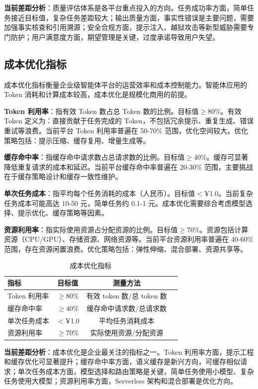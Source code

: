 \documentclass[12pt,a4paper]{article}
\begin{document}
\textbf{当前差距分析}：质量评估体系是各平台重点投入的方向。任务成功率方面，简单任务接近目标值，复杂任务差距较大；输出质量方面，事实性错误是主要问题，需要加强事实核查和引用溯源；安全合规方面，提示注入、越狱攻击等新型威胁需要专门防护；用户满意度方面，期望管理是关键，过度承诺导致用户失望。

\subsection{成本优化指标}

成本优化指标衡量企业级智能体平台的运营效率和成本控制能力。智能体应用的 Token 消耗和计算成本较高，成本优化是规模化商用的前提。

\textbf{Token 利用率}：指有效 Token 数占总 Token 数的比例。目标值$\geq$80\%。有效 Token 定义为：直接贡献于任务完成的 Token，不包括冗余提示、重复生成、错误重试等浪费。当前平台 Token 利用率普遍在 50-70\% 范围，优化空间较大。优化策略包括：提示压缩、缓存复用、增量生成等。

\textbf{缓存命中率}：指缓存命中请求数占总请求数的比例。目标值$\geq$40\%。缓存可显著降低重复请求的成本和延迟。当前平台缓存命中率普遍在 20-30\% 范围，主要挑战在于缓存策略设计和缓存一致性维护。

\textbf{单次任务成本}：指平均每个任务消耗的成本（人民币）。目标值$<$¥1.0。当前复杂任务成本可能高达 10-50 元，简单任务约 0.1-1 元。成本优化需要综合考虑模型选择、提示优化、缓存策略等因素。

\textbf{资源利用率}：指实际使用资源占分配资源的比例。目标值$\geq$70\%。资源包括计算资源（CPU/GPU）、存储资源、网络资源等。当前平台资源利用率普遍在 40-60\% 范围，存在资源闲置浪费。优化策略包括：弹性伸缩、混合部署、资源共享等。

\begin{table}[h]
\centering
\caption{成本优化指标}
\label{tab:cost}
\begin{tabular}{@{}lccl@{}}
\toprule
\textbf{指标} & \textbf{目标值} & \textbf{测量方法} \\
\midrule
Token 利用率 & $\geq$80\% & 有效 token 数/总 token 数 \\
缓存命中率 & $\geq$40\% & 缓存命中请求数/总请求数 \\
单次任务成本 & $<$¥1.0 & 平均任务消耗成本 \\
资源利用率 & $\geq$70\% & 实际使用资源/分配资源 \\
\bottomrule
\end{tabular}
\end{table}

\textbf{当前差距分析}：成本优化是企业最关注的指标之一。Token 利用率方面，提示工程和缓存优化可显著提升；缓存命中率方面，语义缓存是新兴方向，可缓存相似请求；单次任务成本方面，模型选择和路由策略是关键，简单任务使用小模型、复杂任务使用大模型；资源利用率方面，Serverless 架构和混合部署是优化方向。
\end{document}
